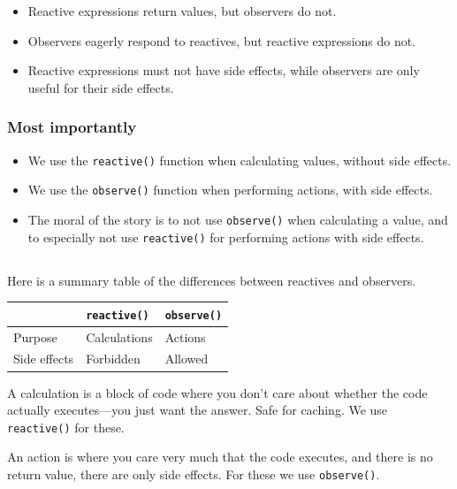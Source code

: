 \documentclass[
  letterpaper,
  DIV=11,
  numbers=noendperiod]{scrreprt}
\providecommand{\tightlist}{%
  \setlength{\itemsep}{0pt}\setlength{\parskip}{0pt}}
\begin{document}
\begin{itemize}
\tightlist
\item
  Reactive expressions return values, but observers do not.
\item
  Observers eagerly respond to reactives, but reactive expressions do
  not.
\item
  Reactive expressions must not have side effects, while observers are
  only useful for their side effects.
\end{itemize}

\hypertarget{most-importantly}{%
\subsubsection{Most importantly}\label{most-importantly}}

\begin{itemize}
\tightlist
\item
  We use the \texttt{reactive()} function when calculating values,
  without side effects.
\item
  We use the \texttt{observe()} function when performing actions, with
  side effects.
\item
  The moral of the story is to not use \texttt{observe()} when
  calculating a value, and to especially not use \texttt{reactive()} for
  performing actions with side effects.
\end{itemize}

\hypertarget{section-48}{%
\subsection{}\label{section-48}}

Here is a summary table of the differences between reactives and
observers.

\begin{longtable}[]{@{}lll@{}}
\toprule
& \texttt{reactive()} & \texttt{observe()} \\
\midrule
\endhead
Purpose & Calculations & Actions \\
Side effects & Forbidden & Allowed \\
\bottomrule
\end{longtable}

A calculation is a block of code where you don't care about whether the
code actually executes---you just want the answer. Safe for caching. We
use \texttt{reactive()} for these.

An action is where you care very much that the code executes, and there
is no return value, there are only side effects. For these we use
\texttt{observe()}.
\end{document}
